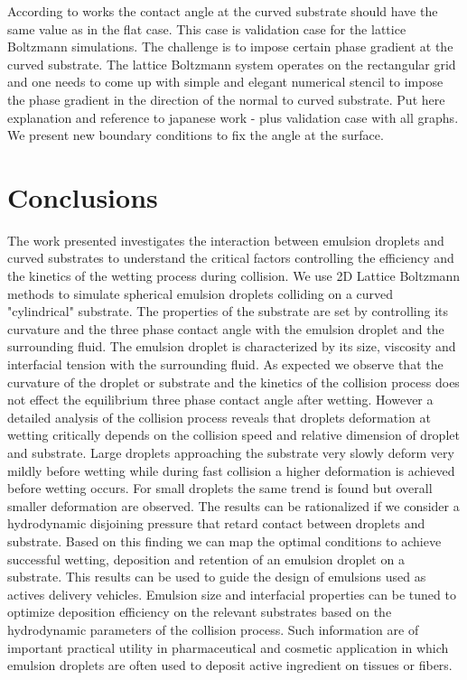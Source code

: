 \documentclass{article}
\begin{document}
According to works \cite{manukyan-curved,carrol-curved} the contact angle at the curved substrate should have the same value as in the flat case. This case is validation case for the lattice Boltzmann simulations. The challenge is to impose certain phase gradient at the curved substrate. The lattice Boltzmann system operates on the rectangular grid and one needs to come up with simple and elegant numerical stencil to impose the phase gradient in the direction of the normal to curved substrate.
{\color{red} Put here explanation and reference to japanese work - plus validation case with all graphs.}
We present new boundary conditions to fix the angle at the surface.

\section{Conclusions}
The work presented investigates the interaction between emulsion droplets and curved substrates to understand the critical factors controlling the efficiency and the kinetics of the wetting process during collision. We use 2D Lattice Boltzmann methods to simulate spherical emulsion droplets colliding on a curved "cylindrical" substrate. The properties of the substrate are set by controlling its curvature and the three phase contact angle with the emulsion droplet and the surrounding fluid. The emulsion droplet is characterized by its size, viscosity and interfacial tension with the surrounding fluid. As expected we observe that the curvature of the droplet or substrate and the kinetics of the collision process does not effect the equilibrium three phase contact angle after wetting. However a detailed analysis of the collision process reveals that droplets deformation at wetting critically depends on the collision speed and relative dimension of droplet and substrate. Large droplets approaching the substrate very slowly deform very mildly before wetting while during fast collision a higher deformation is achieved before wetting occurs. For small droplets the same trend is found but overall smaller deformation are observed. The results can be rationalized if we consider a hydrodynamic disjoining pressure that retard contact between droplets and substrate. Based on this finding we can map the optimal conditions to achieve successful wetting, deposition and retention of an emulsion droplet on a substrate. This results can be used to guide the design of emulsions used as actives delivery vehicles. Emulsion size and interfacial properties can be tuned to optimize deposition efficiency on the relevant substrates based on the hydrodynamic parameters of the collision process. Such information are of important practical utility in pharmaceutical and cosmetic application in which emulsion droplets are often used to deposit active ingredient on tissues or fibers.  


\end{document}
